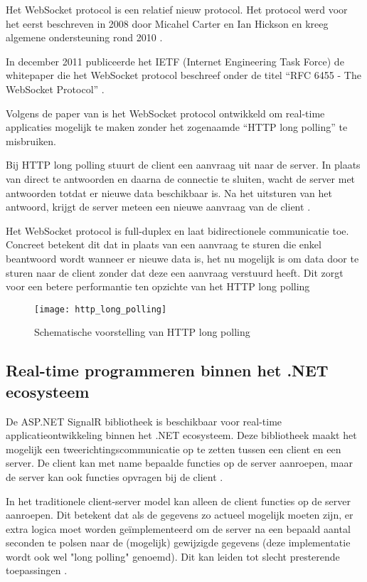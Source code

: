 Het WebSocket protocol is een relatief nieuw protocol. Het protocol werd voor het eerst beschreven in 2008 door Micahel Carter en Ian Hickson en kreeg algemene ondersteuning rond 2010 \autocite{Ably2020}.

In december 2011 publiceerde het IETF (Internet Engineering Task Force) de whitepaper die het WebSocket protocol beschreef onder de titel ``RFC 6455 - The WebSocket Protocol'' \autocite{Fette2011}.

Volgens de paper van \textcite{Fette2011} is het WebSocket protocol ontwikkeld om real-time applicaties mogelijk te maken zonder het zogenaamde ``HTTP long polling'' te misbruiken.

Bij HTTP long polling stuurt de client een aanvraag uit naar de server. In plaats van direct te antwoorden en daarna de connectie te sluiten, wacht de server met antwoorden totdat er nieuwe data beschikbaar is. Na het uitsturen van het antwoord, krijgt de server meteen een nieuwe aanvraag van de client \autocite{Singh}. 

Het WebSocket protocol is full-duplex en laat bidirectionele communicatie toe. Concreet betekent dit dat in plaats van een aanvraag te sturen die enkel beantwoord wordt wanneer er nieuwe data is, het nu mogelijk is om data door te sturen naar de client zonder dat deze een aanvraag verstuurd heeft. Dit zorgt voor een betere performantie ten opzichte van het HTTP long polling \autocite{Fette2011}

\begin{figure}[H]
    \texttt{[image: http\_long\_polling]}
    \centering
    \caption[Schematische voorstelling van HTTP long polling]{Schematische voorstelling van HTTP long polling \autocite{Ably2020}}
    \label{fig:httpLongPolling}
\end{figure}

\subsection{Real-time programmeren binnen het .NET ecosysteem}
De ASP.NET SignalR bibliotheek is beschikbaar voor real-time applicatieontwikkeling binnen het .NET ecosysteem. Deze bibliotheek maakt het mogelijk een tweerichtingscommunicatie op te zetten tussen een client en een server. De client kan met name bepaalde functies op de server aanroepen, maar de server kan ook functies opvragen bij de client \autocite{BradyGaster2020}.

In het traditionele client-server model kan alleen de client functies op de server aanroepen. Dit betekent dat als de gegevens zo actueel mogelijk moeten zijn, er extra logica moet worden geïmplementeerd om de server na een bepaald aantal seconden te polsen naar de (mogelijk) gewijzigde gegevens (deze implementatie wordt ook wel "long polling" genoemd). Dit kan leiden tot slecht presterende toepassingen \autocite{BradyGaster2020}.

